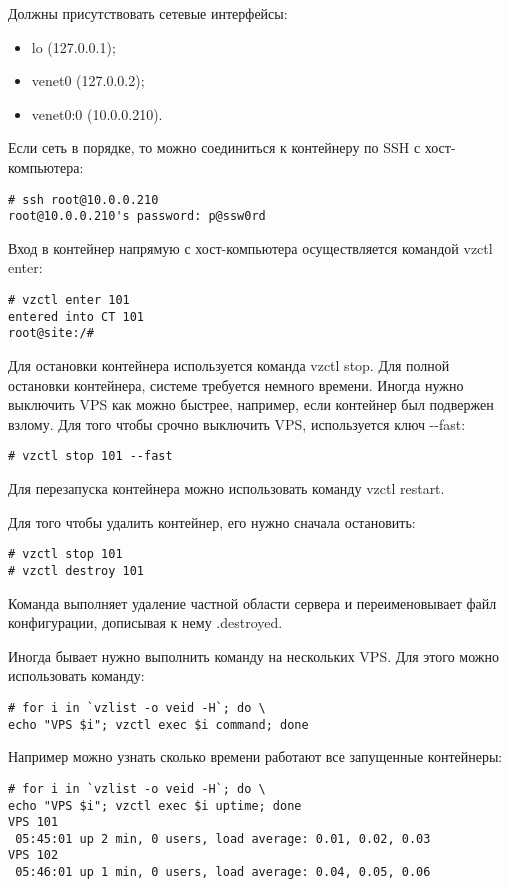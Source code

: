 Должны присутствовать сетевые интерфейсы:
\begin{itemize}
    \item lo (127.0.0.1);
    \item venet0 (127.0.0.2);
    \item venet0:0 (10.0.0.210).
\end{itemize}

Если сеть в порядке, то можно соединиться к контейнеру по SSH с хост-компьютера:
\begin{lstlisting}
# ssh root@10.0.0.210
root@10.0.0.210's password: p@ssw0rd
\end{lstlisting}

Вход в контейнер напрямую с хост-компьютера осуществляется командой vzctl enter:
\begin{lstlisting}
# vzctl enter 101
entered into CT 101
root@site:/#
\end{lstlisting}

Для остановки контейнера используется команда vzctl stop.
Для полной остановки контейнера, системе требуется немного времени.
Иногда нужно выключить VPS как можно быстрее, например, если контейнер был подвержен взлому.
Для того чтобы срочно выключить VPS, используется ключ -{}-fast:
\begin{lstlisting}
# vzctl stop 101 --fast
\end{lstlisting}

Для перезапуска контейнера можно использовать команду vzctl restart.

Для того чтобы удалить контейнер, его нужно сначала остановить:
\begin{lstlisting}
# vzctl stop 101
# vzctl destroy 101
\end{lstlisting}

Команда выполняет удаление частной области сервера и переименовывает файл конфигурации, дописывая к нему .destroyed.

Иногда бывает нужно выполнить команду на нескольких VPS.
Для этого можно использовать команду:
\begin{lstlisting}
# for i in `vzlist -o veid -H`; do \
echo "VPS $i"; vzctl exec $i command; done
\end{lstlisting}

Например можно узнать сколько времени работают все запущенные контейнеры:
\begin{lstlisting}
# for i in `vzlist -o veid -H`; do \
echo "VPS $i"; vzctl exec $i uptime; done
VPS 101
 05:45:01 up 2 min, 0 users, load average: 0.01, 0.02, 0.03
VPS 102
 05:46:01 up 1 min, 0 users, load average: 0.04, 0.05, 0.06
\end{lstlisting}

